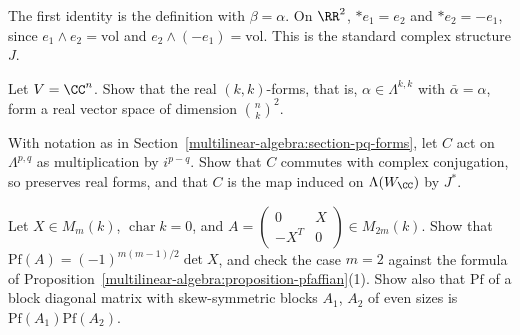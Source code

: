\begin{solution}
The first identity is the definition with $\beta = \alpha$. On $\RR^2$, $*e_1 = e_2$ and $*e_2 = -e_1$, since
$e_1 \wedge e_2 = \mathrm{vol}$ and $e_2 \wedge (-e_1) = \mathrm{vol}$. This is the standard complex structure $J$.
\end{solution}

\begin{exercise}\label{multilinear-algebra:exercise-pq-real-dimension}
Let $V = \CC^n$. Show that the real $(k,k)$-forms, that is, $\alpha \in \Lambda^{k,k}$ with $\bar\alpha = \alpha$, form a real vector space
of dimension $\binom{n}{k}^2$.
\end{exercise}

\begin{exercise}\label{multilinear-algebra:exercise-weil-operator}
With notation as in Section~\ref{multilinear-algebra:section-pq-forms}, let $C$ act on $\Lambda^{p,q}$ as multiplication by
$i^{p-q}$. Show that $C$ commutes with complex conjugation, so preserves real forms, and that $C$ is the map
induced on $\Lambda(W_\CC)$ by $J^*$.
\end{exercise}

\begin{exercise}\label{multilinear-algebra:exercise-pfaffian-blocks}
Let $X \in M_m(k)$, $\operatorname{char}k = 0$, and $A = \begin{pmatrix} 0 & X\\ -X^T & 0\end{pmatrix} \in M_{2m}(k)$. Show that $\mathrm{Pf}(A) = (-1)^{m(m-1)/2}\det X$, and check the
case $m = 2$ against the formula of Proposition~\ref{multilinear-algebra:proposition-pfaffian}(1). Show also that $\mathrm{Pf}$ of a block diagonal matrix with skew-symmetric
blocks $A_1$, $A_2$ of even sizes is $\mathrm{Pf}(A_1)\mathrm{Pf}(A_2)$.
\end{exercise}

